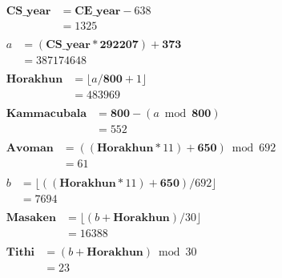 \documentclass[10pt]{article}
\begin{document}
\begin{align*}
\begin{split}
   \mathbf{CS\_year} &= \mathbf{CE\_year} - 638\\
                     &= 1325
\end{split}\\
\begin{split}
                   a &= (\mathbf{CS\_year} * \mathbf{292207}) + \mathbf{373}\\
                     &= 387174648
\end{split}\\
\begin{split}
\mathbf{Horakhun}    &= \lfloor a / \mathbf{800} + 1 \rfloor\\
                     &= 483969
\end{split}\\
\begin{split}
\mathbf{Kammacubala} &= \mathbf{800} - (a \bmod \mathbf{800})\\
                     &= 552
\end{split}\\
\begin{split}
\mathbf{Avoman}      &= ((\mathbf{Horakhun} * 11) + \mathbf{650}) \bmod 692\\
                     &= 61
\end{split}\\
\begin{split}
                   b &= \lfloor ((\mathbf{Horakhun} * 11) + \mathbf{650}) / 692 \rfloor\\
                     &= 7694
\end{split}\\
\begin{split}
\mathbf{Masaken}     &= \lfloor (b + \mathbf{Horakhun}) / 30 \rfloor\\
                     &= 16388
\end{split}\\
\begin{split}
\mathbf{Tithi}       &= (b + \mathbf{Horakhun}) \bmod 30\\
                     &= 23
\end{split}
\end{align*}
\end{document}
